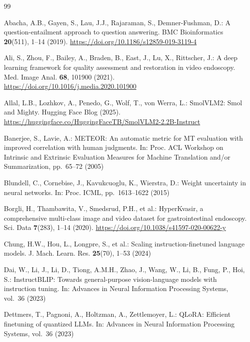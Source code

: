 \documentclass[pdflatex,sn-mathphys-num]{sn-jnl}
\begin{document}
\begin{thebibliography}{99}

Abacha, A.B., Gayen, S., Lau, J.J., Rajaraman, S., Demner-Fushman, D.: A question-entailment approach to question answering. BMC Bioinformatics \textbf{20}(511), 1--14 (2019). \url{https://doi.org/10.1186/s12859-019-3119-4}

Ali, S., Zhou, F., Bailey, A., Braden, B., East, J., Lu, X., Rittscher, J.: A deep learning framework for quality assessment and restoration in video endoscopy. Med. Image Anal. \textbf{68}, 101900 (2021). \url{https://doi.org/10.1016/j.media.2020.101900}

Allal, L.B., Lozhkov, A., Penedo, G., Wolf, T., von Werra, L.: SmolVLM2: Smol and Mighty. Hugging Face Blog (2025). \url{https://huggingface.co/HuggingFaceTB/SmolVLM2-2.2B-Instruct}

Banerjee, S., Lavie, A.: METEOR: An automatic metric for MT evaluation with improved correlation with human judgments. In: Proc. ACL Workshop on Intrinsic and Extrinsic Evaluation Measures for Machine Translation and/or Summarization, pp.~65--72 (2005)

Blundell, C., Cornebise, J., Kavukcuoglu, K., Wierstra, D.: Weight uncertainty in neural networks. In: Proc. ICML, pp.~1613--1622 (2015)

Borgli, H., Thambawita, V., Smedsrud, P.H., et al.: HyperKvasir, a comprehensive multi-class image and video dataset for gastrointestinal endoscopy. Sci. Data \textbf{7}(283), 1--14 (2020). \url{https://doi.org/10.1038/s41597-020-00622-y}

Chung, H.W., Hou, L., Longpre, S., et al.: Scaling instruction-finetuned language models. J. Mach. Learn. Res. \textbf{25}(70), 1--53 (2024)

Dai, W., Li, J., Li, D., Tiong, A.M.H., Zhao, J., Wang, W., Li, B., Fung, P., Hoi, S.: InstructBLIP: Towards general-purpose vision-language models with instruction tuning. In: Advances in Neural Information Processing Systems, vol.~36 (2023)

Dettmers, T., Pagnoni, A., Holtzman, A., Zettlemoyer, L.: QLoRA: Efficient finetuning of quantized LLMs. In: Advances in Neural Information Processing Systems, vol.~36 (2023)


\end{thebibliography}
\end{document}
